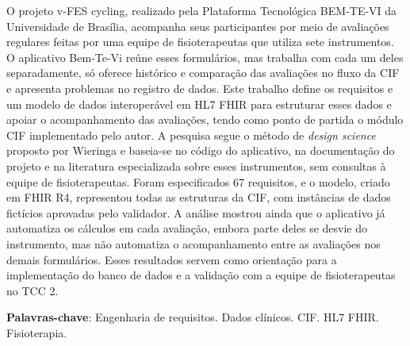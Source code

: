 \begin{resumo}
 O projeto v-FES cycling, realizado pela Plataforma Tecnológica BEM-TE-VI da Universidade de Brasília, acompanha
 seus participantes por meio de avaliações regulares feitas por uma equipe de fisioterapeutas que utiliza sete
 instrumentos. O aplicativo Bem-Te-Vi reúne esses formulários, mas trabalha com cada um deles separadamente, só
 oferece histórico e comparação das avaliações no fluxo da CIF e apresenta problemas no registro de dados. Este
 trabalho define os requisitos e um modelo de dados interoperável em HL7 FHIR para estruturar esses dados e
 apoiar o acompanhamento das avaliações, tendo como ponto de partida o módulo CIF implementado pelo autor. A
 pesquisa segue o método de \textit{design science} proposto por Wieringa e baseia-se no
 código do aplicativo, na documentação do projeto e na literatura especializada sobre esses instrumentos, sem
 consultas à equipe de fisioterapeutas. Foram especificados 67 requisitos, e o modelo, criado em FHIR R4,
 representou todas as estruturas da CIF, com instâncias de dados fictícios aprovadas pelo validador. A análise
 mostrou ainda que o aplicativo já automatiza os cálculos em cada avaliação, embora parte deles se desvie do
 instrumento, mas não automatiza o acompanhamento entre as avaliações nos demais formulários. Esses resultados
 servem como orientação para a implementação do banco de dados e a validação com a equipe de fisioterapeutas no
 TCC 2.

 \vspace{\onelineskip}

 \noindent
 \textbf{Palavras-chave}: Engenharia de requisitos. Dados clínicos. CIF. HL7 FHIR. Fisioterapia.
\end{resumo}
